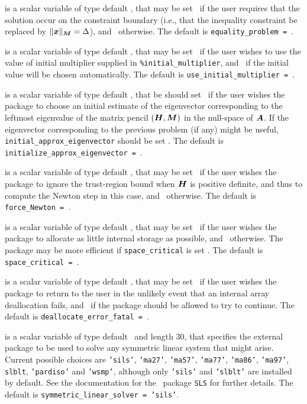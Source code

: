 \documentclass{galahad}
\begin{document}
\begin{description}
 is a scalar variable of type default \logical, that
may be set \true\ if the user requires that the solution
occur on the constraint boundary (i.e., that the inequality constraint be
replaced by $\|{\bm{x}}\|_{{\bm{M}}} = \Delta$), and \false\ otherwise.
The default is {\tt equality\_problem = \false}.

 is a scalar variable of type default \logical,
that may be set \true\ if the user wishes to use the value of initial
multiplier supplied in {\tt \%initial\_multiplier},
and \false\ if the initial value will be chosen automatically.
The default is {\tt use\_initial\_multiplier = \false}.

 is a scalar variable of type default
\logical, that be should set \true\ if the user wishes the package to choose an
initial estimate of the eigenvector corresponding to the leftmost eigenvalue of
the matrix pencil $({\bm{H}},{\bm{M}})$ in the null-space of ${\bm{A}}$.
If the eigenvector corresponding to the previous
problem (if any) might be useful, {\tt initial\_approx\_eigenvector}
should be set \false.
The default is {\tt initialize\_approx\_eigenvector = \true}.

 is a scalar variable of type default \logical, that
may be set \true\ if the user wishes the package to ignore the
trust-region bound when ${\bm{H}}$ is positive definite, and thus to compute
the Newton step in this case, and \false\ otherwise.
The default is {\tt force\_Newton = \false}.

 is a scalar variable of type default \logical, that
may be set \true\ if the user wishes the package to allocate as little
internal storage as possible, and \false\ otherwise. The package may
be more efficient if {\tt space\_critical} is set \false.
The default is {\tt space\_critical = \false}.

 is a scalar variable of type default \logical,
that may be set \true\ if the user wishes the package to return to the user
in the unlikely event that an internal array deallocation fails,
and \false\ if the package should be allowed to try to continue.
The default is {\tt deallocate\_error\_fatal = \false}.

 is a scalar variable of type default \character\
and length 30, that specifies the external package to be used to
solve any symmetric linear system that might arise. Current possible
choices are {\tt 'sils'}, {\tt 'ma27'}, {\tt 'ma57'}, {\tt 'ma77'},
{\tt 'ma86'}, {\tt 'ma97'}, {\tt slblt}, {\tt 'pardiso'}
and {\tt 'wsmp'},
although only {\tt 'sils'} and {\tt 'slblt'} are installed by default.
See the documentation for the \galahad\ package {\tt SLS} for further details.
The default is {\tt symmetric\_linear\_solver = 'sils'}.


\end{description}
\end{document}
